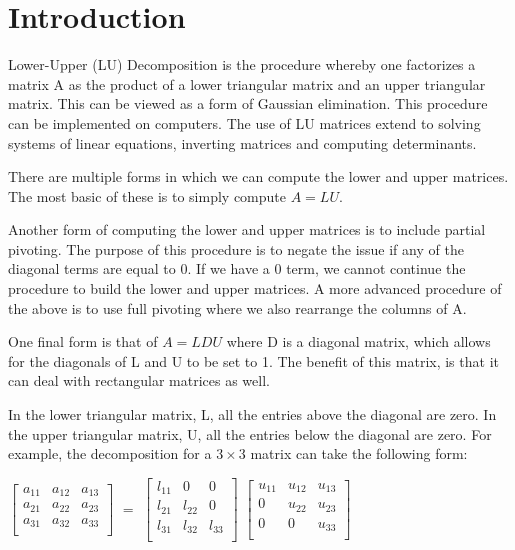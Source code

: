 \section{Introduction}
Lower-Upper (LU) Decomposition is the procedure whereby one factorizes a matrix A as the product of a lower triangular matrix and an upper triangular matrix. This can be viewed as a form of Gaussian elimination. This procedure can be implemented on computers. The use of LU matrices extend to solving systems of linear equations, inverting matrices and computing determinants.

There are multiple forms in which we can compute the lower and upper matrices. The most basic of these is to simply compute $A = LU$.

Another form of computing the lower and upper matrices is to include partial pivoting. The purpose of this procedure is to negate the issue if any of the diagonal terms are equal to 0. If we have a 0 term, we cannot continue the procedure to build the lower and upper matrices. A more advanced procedure of the above is to use full pivoting where we also rearrange the columns of A.

One final form is that of $A = LDU$ where D is a diagonal matrix, which allows for the diagonals of L and U to be set to 1. The benefit of this matrix, is that it can deal with rectangular matrices as well.

In the lower triangular matrix, L, all the entries above the diagonal are zero. In the upper triangular matrix, U, all the entries below the diagonal are zero. For example, the decomposition for a $3 \times 3$ matrix can take the following form:

$
\begin{bmatrix}
    a_{11} & a_{12} & a_{13}\\
    a_{21} & a_{22} & a_{23}\\
    a_{31} & a_{32} & a_{33}\\
\end{bmatrix}
$
$=$
$
\begin{bmatrix}
    l_{11} & 0 & 0\\
    l_{21} & l_{22} & 0\\
    l_{31} & l_{32} & l_{33}\\
\end{bmatrix}
$
$
\begin{bmatrix}
    u_{11} & u_{12} & u_{13}\\
    0 & u_{22} & u_{23}\\
    0 & 0 & u_{33}\\
\end{bmatrix}
$
